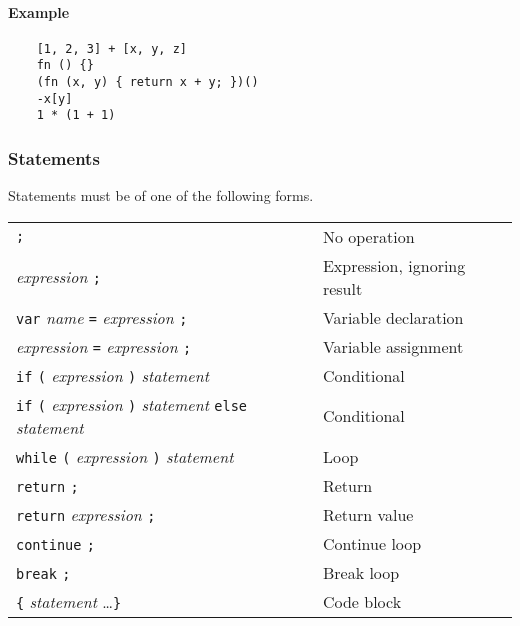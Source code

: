 \documentclass[12pt, a4paper]{article}
\begin{document}
\paragraph{Example}

\begin{verbatim}
    [1, 2, 3] + [x, y, z]
    fn () {}
    (fn (x, y) { return x + y; })()
    -x[y]
    1 * (1 + 1)
\end{verbatim}

\subsubsection{Statements}

Statements must be of one of the following forms.

\begin{table}[H]
    \begin{tabular}{ l l }
        \verb|;|                                                                                          & No operation                \\
        \textit{expression} \verb|;|                                                                      & Expression, ignoring result \\
        \verb|var| \textit{name} \verb|=| \textit{expression} \verb|;|                                    & Variable declaration        \\
        \textit{expression} \verb|=| \textit{expression} \verb|;|                                         & Variable assignment         \\
        \verb|if| \verb|(| \textit{expression} \verb|)| \textit{statement}                                & Conditional                 \\
        \verb|if| \verb|(| \textit{expression} \verb|)| \textit{statement} \verb|else| \textit{statement} & Conditional                 \\
        \verb|while| \verb|(| \textit{expression} \verb|)| \textit{statement}                             & Loop                        \\
        \verb|return| \verb|;|                                                                            & Return                      \\
        \verb|return| \textit{expression} \verb|;|                                                        & Return value                \\
        \verb|continue| \verb|;|                                                                          & Continue loop               \\
        \verb|break| \verb|;|                                                                             & Break loop                  \\
        \verb|{| \textit{statement} \ldots \verb|}|                                                       & Code block                  \\
    \end{tabular}
\end{table}
\end{document}

